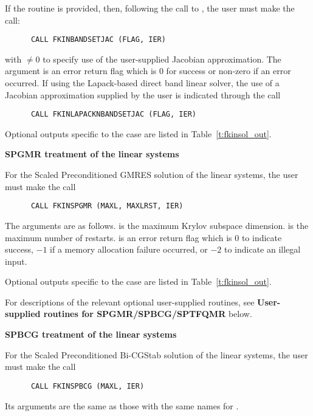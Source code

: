 \begin{Steps}
  If the  routine is provided, then, following the call to ,
  the user must make the call:
\begin{verbatim}
      CALL FKINBANDSETJAC (FLAG, IER)
\end{verbatim}
  with  $\neq 0$ to specify use of the user-supplied Jacobian approximation.
  The argument  is an error return flag which is $0$ 
  for success or non-zero if an error occurred.
  If using the Lapack-based direct band linear solver, the use of a
  Jacobian approximation supplied by the user is indicated through the call
\begin{verbatim}
      CALL FKINLAPACKNBANDSETJAC (FLAG, IER)
\end{verbatim}

  Optional outputs specific to the {\band} case are listed in Table~\ref{t:fkinsol_out}.

  
  {\s}{\p} {\bf SPGMR treatment of the linear systems}

  For the Scaled Preconditioned GMRES solution of the linear systems,
  the user must make the call
\begin{verbatim}
      CALL FKINSPGMR (MAXL, MAXLRST, IER)
\end{verbatim}
  The arguments are as follows.
   is the maximum Krylov subspace dimension.
   is the maximum number of restarts.
   is an error return flag which is $0$ to indicate success, $-1$
  if a memory allocation failure occurred, or $-2$ to indicate an illegal input.
  
  Optional outputs specific to the {\spgmr} case are listed in
  Table~\ref{t:fkinsol_out}.

  For descriptions of the relevant optional user-supplied routines, see 
  {\bf User-supplied routines for SPGMR/SPBCG/SPTFQMR} below.
  
  
  {\s}{\p} {\bf SPBCG treatment of the linear systems}
  
  For the Scaled Preconditioned Bi-CGStab solution of the linear systems,
  the user must make the call
\begin{verbatim}
      CALL FKINSPBCG (MAXL, IER)
\end{verbatim}
  Its arguments are the same as those with the same names for .


\end{Steps}
